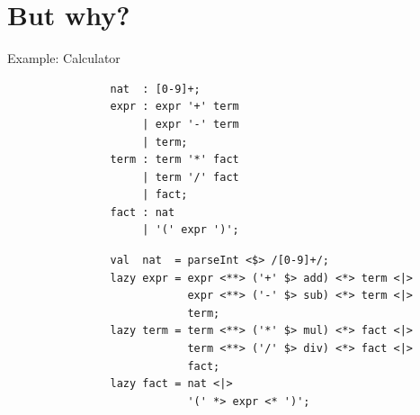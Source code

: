 \documentclass[aspectratio=169]{beamer}
\begin{document}
    \section{But why?}
    \begin{frame}[fragile]{Example: Calculator}
        \begin{overprint}
            \begin{verbatim}
                nat  : [0-9]+;
                expr : expr '+' term
                     | expr '-' term
                     | term;
                term : term '*' fact
                     | term '/' fact
                     | fact;
                fact : nat
                     | '(' expr ')';
            \end{verbatim}
            \begin{verbatim}
                val  nat  = parseInt <$> /[0-9]+/;
                lazy expr = expr <**> ('+' $> add) <*> term <|>
                            expr <**> ('-' $> sub) <*> term <|>
                            term;
                lazy term = term <**> ('*' $> mul) <*> fact <|>
                            term <**> ('/' $> div) <*> fact <|>
                            fact;
                lazy fact = nat <|>
                            '(' *> expr <* ')';
            \end{verbatim}
        \end{overprint}
    \end{frame}
\end{document}
